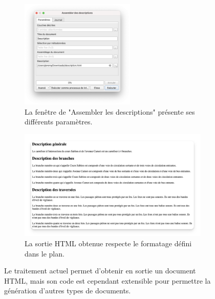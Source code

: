 \begin{figure}[ht]
    \centering
    \begin{subfigure}[t]{.49\linewidth}
        \centering
        \includegraphics[width=0.6\textwidth]{images/experimentation/qgis2desc_assemblage.png}
        \caption{La fenêtre de "Assembler les descriptions" présente ses différents paramètres.}
        \label{fig:experimentation_assemblage_fenetre}
    \end{subfigure}
    \begin{subfigure}[t]{.49\linewidth}
        \centering
        \includegraphics[width=\textwidth]{images/experimentation/qgis2desc_html.png}
        \caption{La sortie HTML obtenue respecte le formatage défini dans le plan.}
        \label{fig:experimentation_assemblage_html}
    \end{subfigure}
    \caption{Le traitement actuel permet d'obtenir en sortie un document HTML, mais son code est cependant extensible pour permettre la génération d'autres types de documents.}
    \label{fig:experimentation_assemblage}
\end{figure}


